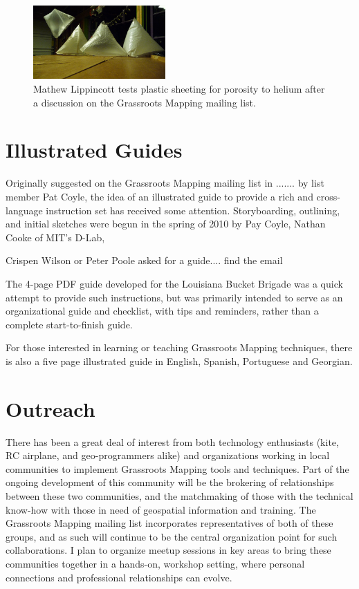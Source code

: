 \documentclass[11pt,oneside,notitlepage]{report}
\begin{document}
\begin{figure}
	\begin{flushright}
		\includegraphics[width=0.45\textwidth]{images/mathew-lippincott-balloons.png}
		\caption{Mathew Lippincott tests plastic sheeting for porosity to helium after a discussion on the Grassroots Mapping mailing list. \cite{lippincott2010helium}}
	\end{flushright}
\end{figure}


\section{Illustrated Guides}
\label{sec:guide}

Originally suggested on the Grassroots Mapping mailing list in ....... by list member Pat Coyle, the idea of an illustrated guide to provide a rich and cross-language instruction set has received some attention. Storyboarding, outlining, and initial sketches were begun in the spring of 2010 by Pay Coyle, Nathan Cooke of MIT's D-Lab, 

Crispen Wilson or Peter Poole asked for a guide.... find the email

The 4-page PDF guide developed for the Louisiana Bucket Brigade was a quick attempt to provide such instructions, but was primarily intended to serve as an organizational guide and checklist, with tips and reminders, rather than a complete start-to-finish guide. 

For those interested in learning or teaching Grassroots Mapping techniques, there is also a five page illustrated guide in English, Spanish, Portuguese and Georgian.

\section{Outreach}

There has been a great deal of interest from both technology enthusiasts (kite, RC airplane, and geo-programmers alike) and organizations working in local communities to implement Grassroots Mapping tools and techniques. Part of the ongoing development of this community will be the brokering of relationships between these two communities, and the matchmaking of those with the technical know-how with those in need of geospatial information and training. The Grassroots Mapping mailing list incorporates representatives of both of these groups, and as such will continue to be the central organization point for such collaborations. I plan to organize meetup sessions in key areas to bring these communities together in a hands-on, workshop setting, where personal connections and professional relationships can evolve.
\end{document}
